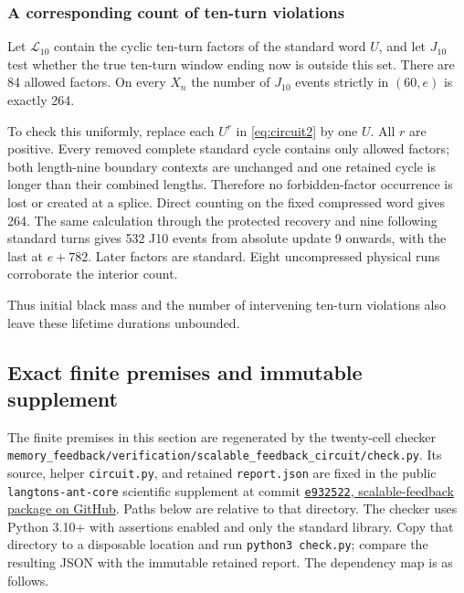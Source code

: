\documentclass[
  11pt,
]{article}
\begin{document}
\subsubsection{A corresponding count of ten-turn violations}\label{the-same-obstruction-for-the-concurrent-j10-event}

Let $\mathcal L_{10}$ contain the cyclic ten-turn factors of the
standard word $U$, and let $J_{10}$ test whether the true ten-turn window
ending now is outside this set. There are
84 allowed factors. On every $X_n$ the number of \(J_{10}\) events strictly in
\((60,e)\) is exactly 264.

To check this uniformly, replace each $U^r$ in \eqref{eq:circuit2} by one \(U\). All
\(r\) are positive. Every removed complete standard cycle contains only
allowed factors; both length-nine boundary contexts are unchanged and
one retained cycle is longer than their combined lengths. Therefore no
forbidden-factor occurrence is lost or created at a splice. Direct
counting on the fixed compressed word gives 264. The same calculation
through the protected recovery and nine following standard turns gives
532 J10 events from absolute update 9 onwards, with the last at \(e+782\).
Later factors are standard. Eight uncompressed physical runs corroborate
the interior count.

Thus initial black mass and the number of intervening ten-turn
violations also leave these lifetime durations unbounded.

\subsection{Exact finite premises and immutable supplement}\label{finite-premises}

The finite premises in this section are regenerated by the twenty-cell
checker \nolinkurl{memory_feedback/verification/scalable_feedback_circuit/check.py}.
Its source, helper \nolinkurl{circuit.py}, and retained \nolinkurl{report.json}
are fixed in the public \texttt{langtons-ant-core} scientific supplement at commit
\href{https://github.com/kehao95/langtons-ant-core/tree/e93252230ea9109908c23a009824d72d30fb91e2/memory_feedback/verification/scalable_feedback_circuit}{\texttt{e932522}, scalable-feedback package on GitHub}.
Paths below are relative to that directory. The checker uses Python 3.10+
with assertions enabled and only the standard library. Copy that directory to a disposable location
and run \nolinkurl{python3 check.py}; compare the resulting JSON with the
immutable retained report. The dependency map is as follows.
\end{document}
